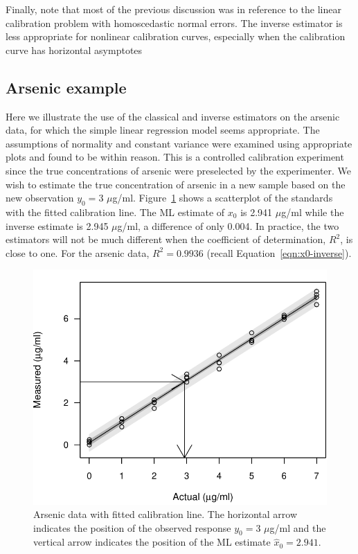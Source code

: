 \documentclass[cmfont,usenames,dvipsnames,leqno]{afit-etd}\usepackage[]{graphicx}\usepackage[]{color}
\makeatletter
\def\maxwidth{ %
  \ifdim\Gin@nat@width>\linewidth
    \linewidth
  \else
    \Gin@nat@width
  \fi
}
\newenvironment{knitrout}{}{} %
\renewenvironment{knitrout}{\begin{singlespace}}{\end{singlespace}}
\newcommand{\wh}[1]{\ensuremath{\widehat{#1}}}
\makeatother
\begin{document}
Finally, note that most of the previous discussion was in reference to the linear calibration problem with homoscedastic normal errors. The inverse estimator is less appropriate for nonlinear calibration curves, especially when the calibration curve has horizontal asymptotes \citep{jones_bootstrapping_1999}

\subsection{Arsenic example}
\label{sec:example_arsenic}
Here we illustrate the use of the classical and inverse estimators on the arsenic data, for which the simple linear regression model seems appropriate. The assumptions of normality and constant variance were examined using appropriate plots and found to be within reason. This is a controlled calibration experiment since the true concentrations of arsenic were preselected by the experimenter. We wish to estimate the true concentration of arsenic in a new sample based on the new observation $y_0 = 3$ $\mu$g/ml. Figure~\ref{fig:arsenic-fit} shows a scatterplot of the standards with the fitted calibration line. The ML estimate of $x_0$ is 2.941 $\mu$g/ml while the inverse estimate is 2.945 $\mu$g/ml, a difference of only 0.004. In practice, the two estimators will not be much different when the coefficient of determination, $R^2$, is close to one. For the arsenic data, $R^2 = 0.9936$ (recall Equation~\ref{eqn:x0-inverse}).

\begin{knitrout}
\color{fgcolor}\begin{figure}[H]

\includegraphics[width=\maxwidth]{figure/arsenic-fit} \caption[Fitted calibration line for the arsenic data]{Arsenic data with fitted calibration line. The horizontal arrow indicates the position of the observed response $y_0 = 3$ $\mu$g/ml and the vertical arrow indicates the position of the ML estimate $\wh{x}_0 = 2.941$.\label{fig:arsenic-fit}}
\end{figure}


\end{knitrout}
\end{document}
